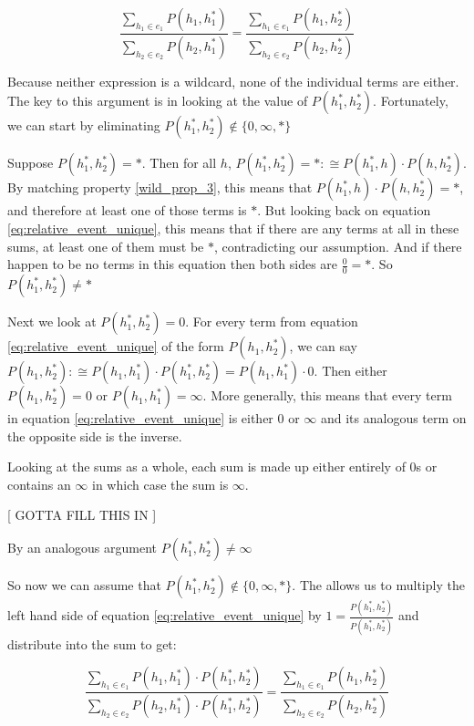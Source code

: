\documentclass[twoside]{article}
\theoremstyle{plain}%
\theoremstyle{definition}
\theoremstyle{remark}
\begin{document}
\begin{equation}
\label{eq:relative_event_unique}
\frac{\sum_{h_1 \in e_1} P(h_1, h_1^*)}{\sum_{h_2 \in e_2} P(h_2, h_1^*)} = \frac{\sum_{h_1 \in e_1} P(h_1, h_2^*)}{\sum_{h_2 \in e_2} P(h_2, h_2^*)}
\end{equation}

Because neither expression is a wildcard, none of the individual terms are either. The key to this argument is in looking at the value of \(P(h_1^*, h_2^*)\). Fortunately, we can start by eliminating \(P(h_1^*, h_2^*) \notin \{0, \infty, \ast\} \)

Suppose \(P(h_1^*, h_2^*) = \ast\). Then for all \(h\), \(P(h_1^*, h_2^*) = \ast :\cong P(h_1^*, h) \cdot P(h, h_2^*)\). By matching property \ref{wild_prop_3}, this means that \(P(h_1^*, h) \cdot P(h, h_2^*) = \ast\), and therefore at least one of those terms is \(\ast\). But looking back on equation \ref{eq:relative_event_unique}, this means that if there are any terms at all in these sums, at least one of them must be \(\ast\), contradicting our assumption. And if there happen to be no terms in this equation then both sides are \(\frac{0}{0}=\ast\). So \(P(h_1^*, h_2^*) \neq \ast\)

Next we look at \(P(h_1^*, h_2^*) = 0\). For every term from equation \ref{eq:relative_event_unique} of the form \(P(h_1, h_2^*)\), we can say \(P(h_1, h_2^*):\cong P(h_1, h_1^*) \cdot P(h_1^*, h_2^*) = P(h_1, h_1^*) \cdot 0\). Then either \(P(h_1, h_2^*) = 0\) or \(P(h_1, h_1^*) = \infty\). More generally, this means that every term in equation \ref{eq:relative_event_unique} is either \(0\) or \(\infty\) and its analogous term on the opposite side is the inverse.

Looking at the sums as a whole, each sum is made up either entirely of 0s or contains an \(\infty\) in which case the sum is \(\infty\).

[ GOTTA FILL THIS IN ]

By an analogous argument  \(P(h_1^*, h_2^*) \neq \infty\)

So now we can assume that \(P(h_1^*, h_2^*) \notin \{0, \infty, \ast\} \). The allows us to multiply the left hand side of equation \ref{eq:relative_event_unique} by \(1 = \frac{P(h_1^*, h_2^*)}{P(h_1^*, h_2^*)}\) and distribute into the sum to get:

\[\frac{\sum_{h_1 \in e_1} P(h_1, h_1^*) \cdot P(h_1^*, h_2^*)}{\sum_{h_2 \in e_2} P(h_2, h_1^*) \cdot P(h_1^*, h_2^*)} = \frac{\sum_{h_1 \in e_1} P(h_1, h_2^*)}{\sum_{h_2 \in e_2} P(h_2, h_2^*)}\]
\end{document}
